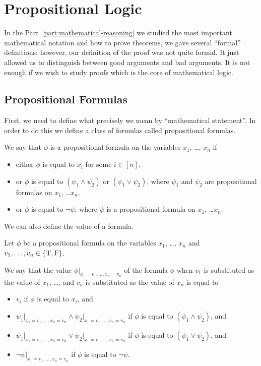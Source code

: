 \chapter{Propositional Logic}
In the Part~\ref{part:mathematical-reasoning} we studied the most important
mathematical notation and how to prove theorems, we gave several ``formal''
definitions; however, our definition of the proof was not quite formal. It just
allowed us to distinguish between good arguments and bad arguments. It is not
enough if we wish to study proofs which is the core of mathematical logic.

\section{Propositional Formulas}
First, we need to define what precisely we mean by ``mathematical statement''.
In order to do this we define a class of formulas called propositional formulas.
\begin{definition}
  We say that $\phi$ is a propositional formula on the variables $x_1$, \dots,
  $x_n$ if
  \begin{itemize}
    \item either $\phi$ is equal to $x_i$ for some $i \in [n]$,
    \item or $\phi$ is equal to $(\psi_1 \land \psi_2)$ or
      $(\psi_1 \lor \psi_2)$, where $\psi_1$ and $\psi_2$ are propositional
      formulas on $x_1$, \dots $x_n$,
    \item or $\phi$ is equal to $\lnot \psi$, where $\psi$ is a propositional
      formula on $x_1$, \dots $x_n$.
  \end{itemize}
\end{definition}

We can also define the value of a formula.
\begin{definition}
  Let $\phi$ be a propositional formula on the variables $x_1$, \dots, $x_n$
  and $v_1, \dots, v_n \in \set{\text{T}, \text{F}}$.

  We say that the value $\phi\big\rvert_{x_1 = v_1, \dots, x_n = v_n}$ of the
  formula $\phi$ when $v_1$ is substituted as the value of $x_1$, \dots,
  and $v_n$  is substituted as the value of $x_n$ is equal to
  \begin{itemize}
    \item $v_i$ if $\phi$ is equal to $x_i$, and
    \item $\psi_1\big\rvert_{x_1 = v_1, \dots, x_n = v_n} \land
      \psi_2\big\rvert_{x_1 = v_1, \dots, x_n = v_n}$ if
      $\phi$ is equal to $(\psi_1 \land \psi_2)$, and
    \item $\psi_1\big\rvert_{x_1 = v_1, \dots, x_n = v_n} \lor
      \psi_2\big\rvert_{x_1 = v_1, \dots, x_n = v_n}$ if
      $\phi$ is equal to $(\psi_1 \lor \psi_2)$, and
    \item $\lnot\psi\big\rvert_{x_1 = v_1, \dots, x_n = v_n}$
      if $\phi$ is equal to $\lnot \psi$.
  \end{itemize}
\end{definition}

